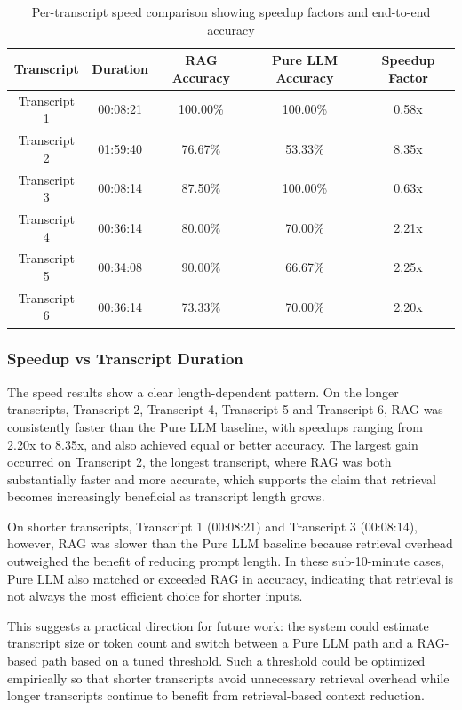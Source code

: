 \begin{table}[H]
  \centering
  \begingroup
  \small
  \setlength{\tabcolsep}{4pt}
  \begin{tabular}{|c|c|c|c|c|}
    \hline
    \textbf{Transcript} & \textbf{Duration} & \textbf{RAG Accuracy} & \textbf{Pure LLM Accuracy} & \textbf{Speedup Factor} \\
    \hline
    Transcript 1 & 00:08:21 & 100.00\% & 100.00\% & 0.58x \\
    \hline
    Transcript 2 & 01:59:40 & 76.67\% & 53.33\% & 8.35x \\
    \hline
    Transcript 3 & 00:08:14 & 87.50\% & 100.00\% & 0.63x \\
    \hline
    Transcript 4 & 00:36:14 & 80.00\% & 70.00\% & 2.21x \\
    \hline
    Transcript 5 & 00:34:08 & 90.00\% & 66.67\% & 2.25x \\
    \hline
    Transcript 6 & 00:36:14 & 73.33\% & 70.00\% & 2.20x \\
    \hline
  \end{tabular}
  \endgroup
  \caption{Per-transcript speed comparison showing speedup factors and end-to-end accuracy}
  \label{tab:speed-comparison}
\end{table}

\subsubsection*{Speedup vs Transcript Duration}
The speed results show a clear length-dependent pattern. On the longer transcripts, Transcript 2, Transcript 4, Transcript 5 and Transcript 6, RAG was consistently faster than the Pure LLM baseline, with speedups ranging from 2.20x to 8.35x, and also achieved equal or better accuracy. The largest gain occurred on Transcript 2, the longest transcript, where RAG was both substantially faster and more accurate, which supports the claim that retrieval becomes increasingly beneficial as transcript length grows. 

On shorter transcripts, Transcript 1 (00:08:21) and Transcript 3 (00:08:14), however, RAG was slower than the Pure LLM baseline because retrieval overhead outweighed the benefit of reducing prompt length. In these sub-10-minute cases, Pure LLM also matched or exceeded RAG in accuracy, indicating that retrieval is not always the most efficient choice for shorter inputs. 

This suggests a practical direction for future work: the system could estimate transcript size or token count and switch between a Pure LLM path and a RAG-based path based on a tuned threshold. Such a threshold could be optimized empirically so that shorter transcripts avoid unnecessary retrieval overhead while longer transcripts continue to benefit from retrieval-based context reduction.

